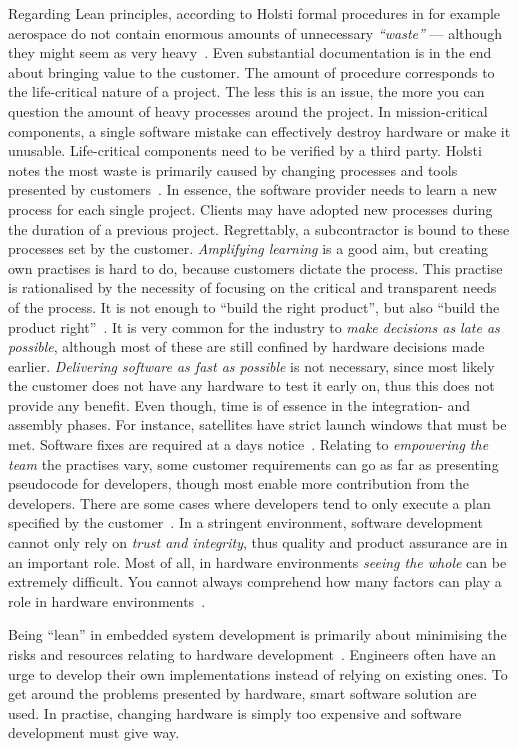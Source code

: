 \documentclass[english]{tktltiki2}
\begin{document}
Regarding Lean principles, according to Holsti formal procedures in for example aerospace do not contain enormous amounts of unnecessary \emph{“waste”} — although they might seem as very heavy~\cite{Hol15b}. Even substantial documentation is in the end about bringing value to the customer. The amount of procedure corresponds to the life-critical nature of a project. The less this is an issue, the more you can question the amount of heavy processes around the project. In mission-critical components, a single software mistake can effectively destroy hardware or make it unusable. Life-critical components need to be verified by a third party. Holsti notes the most waste is primarily caused by changing processes and tools presented by customers~\cite{Hol15b}. In essence, the software provider needs to learn a new process for each single project. Clients may have adopted new processes during the duration of a previous project. Regrettably, a subcontractor is bound to these processes set by the customer. \emph{Amplifying learning} is a good aim, but creating own practises is hard to do, because customers dictate the process. This practise is rationalised by the necessity of focusing on the critical and transparent needs of the process. It is not enough to “build the right product”, but also “build the product right”~\cite{Hol15b}. It is very common for the industry to \emph{make decisions as late as possible}, although most of these are still confined by hardware decisions made earlier. \emph{Delivering software as fast as possible} is not necessary, since most likely the customer does not have any hardware to test it early on, thus this does not provide any benefit. Even though, time is of essence in the integration- and assembly phases. For instance, satellites have strict launch windows that must be met. Software fixes are required at a days notice~\cite{Hol15b}. Relating to \emph{empowering the team} the practises vary, some customer requirements can go as far as presenting pseudocode for developers, though most enable more contribution from the developers. There are some cases where developers tend to only execute a plan specified by the customer~\cite{Hol15b}. In a stringent environment, software development cannot only rely on \emph{trust and integrity}, thus quality and product assurance are in an important role. Most of all, in hardware environments \emph{seeing the whole} can be extremely difficult. You cannot always comprehend how many factors can play a role in hardware environments~\cite{Hol15a, Hol15b}.

Being “lean” in embedded system development is primarily about minimising the risks and resources relating to hardware development~\cite{Hol15a}. Engineers often have an urge to develop their own implementations instead of relying on existing ones. To get around the problems presented by hardware, smart software solution are used. In practise, changing hardware is simply too expensive and software development must give way.
\end{document}
